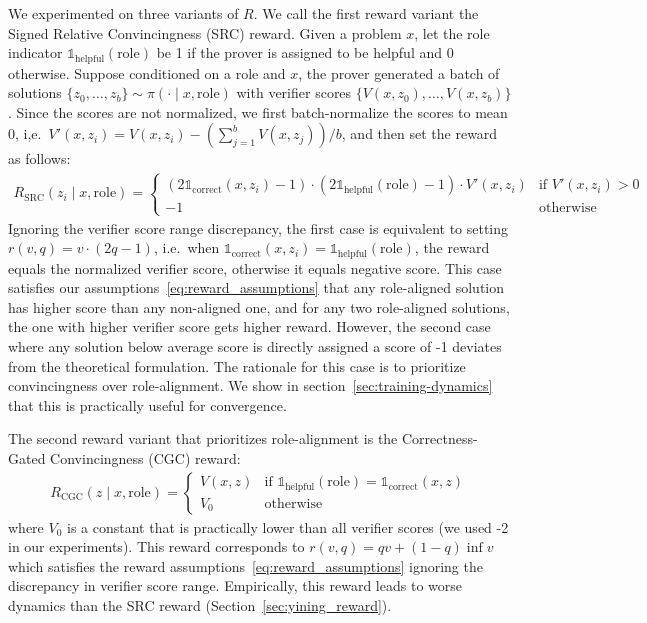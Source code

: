 \documentclass{article}
\newcommand{\indcor}[1]{\mathds{1}_{\text{correct}}\left({#1}\right)}
\newcommand{\indhelpful}[1]{\mathds{1}_{\text{helpful}}\left({#1}\right)}
\begin{document}
We experimented on three variants of $R$. We call the first reward variant the Signed Relative Convincingness (SRC) reward. Given a problem $x$, let the role indicator $\indhelpful{\text{role}}$ be 1 if the prover is assigned to be helpful and 0 otherwise. Suppose conditioned on a role and $x$, the prover generated a batch of solutions $\{z_0, \dots, z_b\} \sim \pi(\cdot \mid x, \text{role})$ with verifier scores $\{V(x, z_0), \dots, V(x, z_b)\}$. Since the scores are not normalized, we first batch-normalize the scores to mean 0, i,e.~$V'(x, z_i) = V(x, z_i) - (\sum_{j=1}^b V(x, z_j))/b$, and then set the reward as follows:
\begin{align}
\label{eq:default_reward}
    R_{\text{SRC}}(z_i \mid x, \text{role}) =
    \begin{cases}
      (2\indcor{x, z_i}-1) \cdot (2\indhelpful{\text{role}}-1) \cdot V'(x, z_i) & \text{if $V'(x, z_i)>0$} \\
      -1 & \text{otherwise}
    \end{cases} 
\end{align} Ignoring the verifier score range discrepancy, the first case is equivalent to setting $r(v, q) = v \cdot (2q-1)$, i.e.~when $\indcor{x, z_i} = \indhelpful{\text{role}}$, the reward equals the normalized verifier score, otherwise it equals negative score. This case satisfies our assumptions~\eqref{eq:reward_assumptions} that any role-aligned solution has higher score than any non-aligned one, and for any two role-aligned solutions, the one with higher verifier score gets higher reward. However, the second case where any solution below average score is directly assigned a score of -1 deviates from the theoretical formulation. The rationale for this case is to prioritize convincingness over role-alignment. We show in section~\ref{sec:training-dynamics} that this is practically useful for convergence.

The second reward variant that prioritizes role-alignment is the Correctness-Gated Convincingness (CGC) reward:
\begin{align}
\label{eq:yining_reward}
    R_{\text{CGC}}(z \mid x, \text{role}) =
    \begin{cases}
      V(x, z) & \text{if  $\indhelpful{\text{role}} =\indcor{x, z}$}\\
      V_{0} & \text{otherwise}
    \end{cases} 
\end{align} where $V_0$ is a constant that is practically lower than all verifier scores (we used -2 in our experiments). This reward corresponds to $r(v, q)= q v + (1-q)\inf{v}$ which satisfies the reward assumptions~\eqref{eq:reward_assumptions} ignoring the discrepancy in verifier score range. Empirically, this reward leads to worse dynamics than the SRC reward (Section~\ref{sec:yining_reward}).
\end{document}
